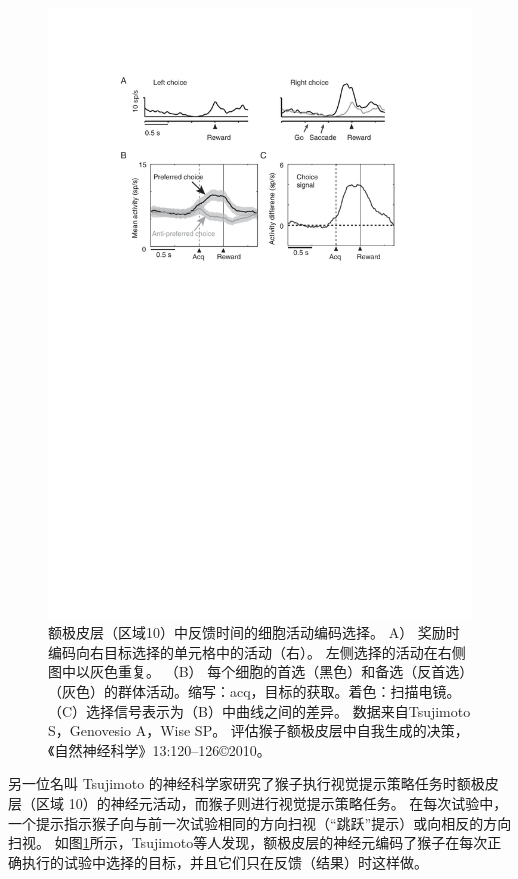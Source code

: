 \begin{figure}[!htb]
	\centering
	\includegraphics{chap3/3_9}
	\caption{额极皮层（区域10）中反馈时间的细胞活动编码选择。
		A） 奖励时编码向右目标选择的单元格中的活动（右）。
		左侧选择的活动在右侧图中以灰色重复。
		（B） 每个细胞的首选（黑色）和备选（反首选）（灰色）的群体活动。缩写：acq，目标的获取。着色：扫描电镜。（C）选择信号表示为（B）中曲线之间的差异。
		数据来自Tsujimoto S，Genovesio A，Wise SP。
		评估猴子额极皮层中自我生成的决策，《自然神经科学》13:120–126©2010。}
	\label{fig:3_9}
\end{figure}


另一位名叫 Tsujimoto 的神经科学家研究了猴子执行视觉提示策略任务时额极皮层（区域 10）的神经元活动，而猴子则进行视觉提示策略任务\cite{tsujimoto2010evaluating}。
在每次试验中，一个提示指示猴子向与前一次试验相同的方向扫视（“跳跃”提示）或向相反的方向扫视。
如图\ref{fig:3_9}所示，Tsujimoto等人发现，额极皮层的神经元编码了猴子在每次正确执行的试验中选择的目标，并且它们只在反馈（结果）时这样做。\par


